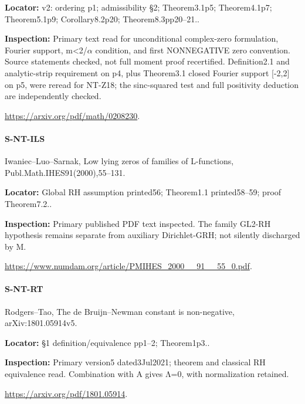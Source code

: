 \documentclass[11pt,a4paper]{article}
\begin{document}
\textbf{Locator:} v2:\allowbreak{} ordering p1; admissibility §2; Theorem3.\allowbreak{}1p5; Theorem4.\allowbreak{}1p7; Theorem5.\allowbreak{}1p9; Corollary8.\allowbreak{}2p20; Theorem8.\allowbreak{}3pp20–\allowbreak{}21.\allowbreak{}.

\textbf{Inspection:} Primary text read for unconditional complex-zero formulation, Fourier support, m<2/\allowbreak{}\ensuremath{\alpha} condition, and first NONNEGATIVE zero convention.\allowbreak{} Source statements checked, not full moment proof recertified.\allowbreak{} Definition2.\allowbreak{}1 and analytic-strip requirement on p4, plus Theorem3.\allowbreak{}1 closed Fourier support [-2,2] on p5, were reread for NT-Z18; the sinc-squared test and full positivity deduction are independently checked.\allowbreak{}

\url{https://arxiv.org/pdf/math/0208230}.

\paragraph{S-NT-ILS} Iwaniec–\allowbreak{}Luo–\allowbreak{}Sarnak, Low lying zeros of families of L-functions, Publ.\allowbreak{}Math.\allowbreak{}IHES91(2000),55–\allowbreak{}131.

\textbf{Locator:} Global RH assumption printed56; Theorem1.\allowbreak{}1 printed58–\allowbreak{}59; proof Theorem7.\allowbreak{}2.\allowbreak{}.

\textbf{Inspection:} Primary published PDF text inspected.\allowbreak{} The family GL2-RH hypothesis remains separate from auxiliary Dirichlet-GRH; not silently discharged by M.\allowbreak{}

\url{https://www.numdam.org/article/PMIHES_2000__91__55_0.pdf}.

\paragraph{S-NT-RT} Rodgers–\allowbreak{}Tao, The de Bruijn–\allowbreak{}Newman constant is non-negative, arXiv:\allowbreak{}1801.\allowbreak{}05914v5.

\textbf{Locator:} §1 definition/\allowbreak{}equivalence pp1–\allowbreak{}2; Theorem1p3.\allowbreak{}.

\textbf{Inspection:} Primary version5 dated3Jul2021; theorem and classical RH equivalence read.\allowbreak{} Combination with A gives Λ=0, with normalization retained.\allowbreak{}

\url{https://arxiv.org/pdf/1801.05914}.
\end{document}
